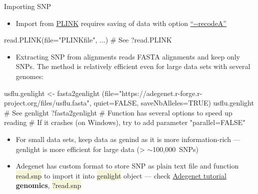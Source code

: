 \documentclass[compress, ucs, xelatex, 11pt, xcolor=svgnames, aspectratio=169,
	hyperref={
		bookmarks=true,
		unicode=true,
		colorlinks=true,
		pdftitle={Molecular data in R},
		plainpages=false,
		pdfauthor={Vojtech Zeisek},
		pdfsubject={Course about phylogeny and evolution in R},
		pdfcreator={XeLaTeX},
		pdfkeywords={R, evolution, phylogeny, molecular data},
		linkcolor=Crimson, %
		anchorcolor=Magenta, %
		citecolor=Magenta, %
		filecolor=Magenta, %
		menucolor=Magenta, %
		urlcolor=DodgerBlue, %
		pdftex},
	url={hyphens, lowtilde} %
	]{beamer}
\renewcommand{\texttt}[1]{\colorbox{Beige}{{\ttfamily #1}}}
\begin{document}
\begin{frame}[fragile]{Importing SNP}
	\begin{itemize}
		\item Import from \href{http://zzz.bwh.harvard.edu/plink/}{PLINK} requires saving of data with option \href{http://zzz.bwh.harvard.edu/plink/dataman.shtml#recode}{\enquote{-{-}recodeA}}
	\end{itemize}
	\begin{spluscode}
    read.PLINK(file="PLINKfile", ...) # See ?read.PLINK
	\end{spluscode}
	\begin{itemize}
		\item Extracting SNP from alignments reads FASTA alignments and keep only SNPs. The method is relatively efficient even for large data sets with several genomes:
	\end{itemize}
	\begin{spluscode}
    usflu.genlight <- fasta2genlight
      (file="https://adegenet.r-forge.r-project.org/files/usflu.fasta",
      quiet=FALSE, saveNbAlleles=TRUE)
    usflu.genlight # See genlight
    ?fasta2genlight # Function has several options to speed up reading
    # If it crashes (on Windows), try to add parameter "parallel=FALSE"
	\end{spluscode}
	\begin{itemize}
		\item For small data sets, keep data as genind as it is more information-rich --- genlight is more efficient for large data (> $\sim$100,000~SNPs)
		\item Adegenet has custom format to store SNP as plain text file and function \texttt{read.snp} to import it into \texttt{genlight} object --- check \href{https://github.com/thibautjombart/adegenet/wiki/Tutorials}{Adegenet tutorial} \textbf{genomics}, \texttt{?read.snp}
	\end{itemize}
\end{frame}
\end{document}
